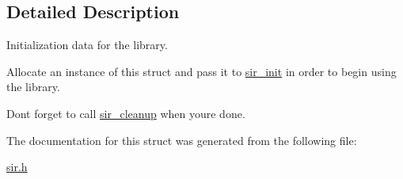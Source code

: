 \subsection{Detailed Description}
Initialization data for the library. 

Allocate an instance of this struct and pass it to \hyperlink{sir_8h_a99c2210334096965d23626fa50dc5d6b}{sir\+\_\+init} in order to begin using the library.

Don\textquotesingle{}t forget to call \hyperlink{sir_8h_ae3d423234ff95592b8d800b8bf092489}{sir\+\_\+cleanup} when you\textquotesingle{}re done. 

The documentation for this struct was generated from the following file\+:\begin{DoxyCompactItemize}
\item 
\hyperlink{sir_8h}{sir.\+h}\end{DoxyCompactItemize}
